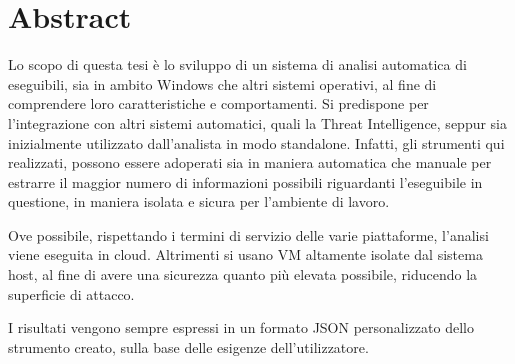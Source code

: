 \section*{Abstract}
Lo scopo di questa tesi è lo sviluppo di un sistema di analisi automatica di eseguibili, sia in ambito Windows che altri sistemi operativi, al fine di comprendere loro caratteristiche e comportamenti.
Si predispone per l'integrazione con altri sistemi automatici, quali la Threat Intelligence, seppur sia inizialmente utilizzato dall'analista in modo standalone.
Infatti, gli strumenti qui realizzati, possono essere adoperati sia in maniera automatica che manuale per estrarre il maggior numero di informazioni possibili riguardanti l'eseguibile in questione, in maniera isolata e sicura per l'ambiente di lavoro.

Ove possibile, rispettando i termini di servizio delle varie piattaforme, l'analisi viene eseguita in cloud. Altrimenti si usano VM altamente isolate dal sistema host, al fine di avere una sicurezza quanto più elevata possibile, riducendo la superficie di attacco.

I risultati vengono sempre espressi in un formato JSON personalizzato dello strumento creato, sulla base delle esigenze dell'utilizzatore.